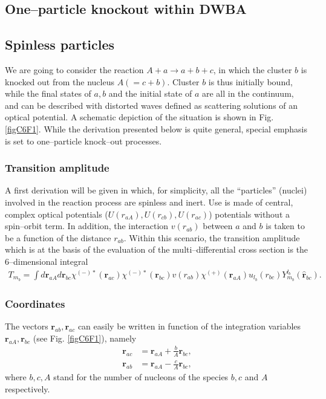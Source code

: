 \begin{subappendices}
\section{One--particle knockout within DWBA}\label{C6AppF}
\subsection{Spinless particles}
We are going to consider the reaction $A+a \rightarrow a+b+c$, in which the cluster $b$ is knocked out from the nucleus $A(=c+b)$. Cluster $b$ is thus initially bound, while the final states of $a,b$ and the initial state of $a$ are all in the continuum, and can be described with distorted waves defined as scattering solutions of an optical potential. A schematic depiction of the situation is shown in Fig. \ref{figC6F1}. While the derivation presented below is quite general, special emphasis is set to one--particle knock--out processes. 
\subsubsection{Transition amplitude}
A first derivation will be given in which, for simplicity, all the ``particles'' (nuclei) involved in the reaction process are spinless and inert. Use is made of central, complex optical potentials ($U(r_{aA}),U(r_{cb}),U(r_{ac})$) potentials without a spin--orbit term. In addition, the interaction $v(r_{ab})$ between $a$ and $b$ is taken to be a function of the distance $r_{ab}$. Within this scenario, the transition amplitude which is at the basis of the evaluation of the multi--differential cross section is the 6--dimensional integral
\begin{equation}\label{eqC6AppF1}
\begin{split}
T_{m_b}=\int d\mathbf{r}_{aA}d \mathbf{r}_{bc}\chi^{(-)*}(\mathbf{r}_{ac})\chi^{(-)*}(\mathbf{r}_{bc})v(r_{ab})\chi^{(+)}(\mathbf{r}_{aA})u_{l_b}(r_{bc})Y^{l_b}_{m_b}(\hat{\mathbf{r}}_{bc}).
\end{split}
\end{equation}
\subsubsection{Coordinates}
The vectors $\mathbf{r}_{ab},\mathbf{r}_{ac}$ can easily be written in function of the integration variables $\mathbf{r}_{aA},\mathbf{r}_{bc}$ (see Fig. \ref{figC6F1}), namely
\begin{equation}\label{eq6G2}
\begin{split}
\mathbf{r}_{ac}&=\mathbf{r}_{aA}+\frac{b}{A}\mathbf{r}_{bc},\\
\mathbf{r}_{ab}&=\mathbf{r}_{aA}-\frac{c}{A}\mathbf{r}_{bc},
\end{split}
\end{equation}
where $b,c,A$ stand for the number of nucleons of the species $b,c$ and $A$ respectively.

\end{subappendices}
